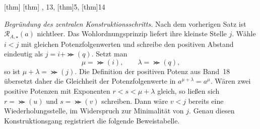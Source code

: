 \documentclass[main.tex]{subfiles}
\begin{document}
\begin{tabproofwide}
{{      [thm]{%
        [thm]{%
          ,
          13},
        [thm]{5}},
      [thm]{14}}}
\end{tabproofwide}


\emph{Begründung des zentralen Konstruktionsschritts.}
Nach dem vorherigen Satz ist \(\mathcal R_{A,\star}(a)\) nichtleer.  Das
Wohlordnungsprinzip liefert ihre kleinste Stelle \(j\).  Wähle
\(i<j\) mit gleichen Potenzfolgenwerten und schreibe den positiven Abstand
eindeutig als \(j=i+\Succ(q)\).  Setzt man
\[
  \mu=\Succ(i),\qquad \lambda=\Succ(q),
\]
so ist \(\mu+\lambda=\Succ(j)\).  Die Definition der positiven Potenz aus
Band~18 übersetzt daher die Gleichheit der Potenzfolgenwerte in
\(a^{\mu+\lambda}=a^\mu\).  Wären zwei positive Potenzen mit Exponenten
\(r<s<\mu+\lambda\) gleich, so ließen sich
\(r=\Succ(u)\) und \(s=\Succ(v)\) schreiben.  Dann wäre
\(v<j\) bereits eine Wiederholungsstelle, im Widerspruch zur Minimalität
von \(j\).  Genau diesen Konstruktionsgang registriert die folgende
Beweistabelle.
\end{document}

